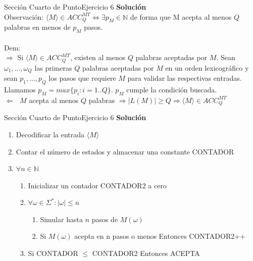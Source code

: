 \documentclass[10pt, envcountsect, presentation, aspectratio=169]{beamer}
\begin{document}
\begin{frame}{Sección Cuarto de Punto}{Ejercicio 6}
    \textbf{Solución}\\
    Observación: $\langle M \rangle \in ACC_{Q}^{MT} \Leftrightarrow \exists p_M \in \mathbb{N}$ de forma que M acepta al menos $Q$ palabras en menos de $p_M$ pasos.\\~\\
    Dem:\\
    $\boxed{\Rightarrow}$ Si $\langle M \rangle \in ACC_{Q}^{MT}$, existen al menos $Q$ palabras aceptadas por $M$.
    Sean $\omega_1, ..., \omega_Q$ las primeras $Q$ palabras aceptadas por $M$ en un orden lexicográfico y sean $p_1,...,p_Q$ los pasos que requiere $M$ para validar las respectivas entradas.
    Llamamos $p_M = max\{p_i:i=1..Q\}$. $p_M$ cumple la condición buscada.\\
    $\boxed{\Leftarrow} \text{ } M$ acepta al menos $Q$ palabras  $\Rightarrow |L(M)| \geq Q \Rightarrow \langle M \rangle \in ACC_{Q}^{MT}$  
\end{frame}
    


\begin{frame}{Sección Cuarto de Punto}{Ejercicio 6}
    \textbf{Solución}\\
    \begin{enumerate}
        \item Decodificar la entrada $\langle M \rangle$
        \item Contar el número de estados y almacenar una constante CONTADOR
        \item $\forall n \in \mathbb{N}$
        \begin{enumerate}
            \item Inicializar un contador CONTADOR2 a cero 
            \item $\forall \omega \in \Sigma^* : |\omega| \leq n$
            \begin{enumerate}
                \item Simular hasta $n$ pasos de $M(\omega)$
                \item Si $M(\omega)$ acepta en n pasos o menos Entonces CONTADOR2++
            \end{enumerate}
            \item Si CONTADOR $\leq$ CONTADOR2 Entonces ACEPTA
        \end{enumerate}
    \end{enumerate}
\end{frame}
\end{document}
